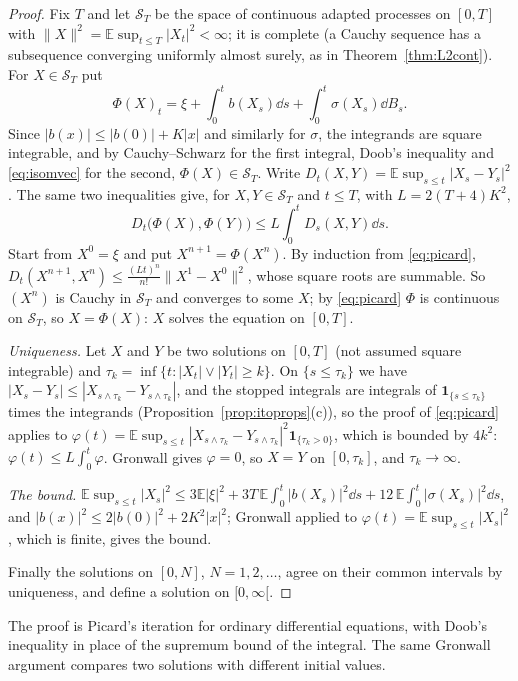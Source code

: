 \begin{proof}
Fix $T$ and let $\mathcal S_T$ be the space of continuous adapted processes on $[0,T]$ with $\|X\|^2=\mathbb E\sup_{t\le T}|X_t|^2<\infty$; it is complete (a Cauchy sequence has a subsequence converging
uniformly almost surely, as in Theorem~\ref{thm:L2cont}). For $X\in\mathcal S_T$ put
\[
\Phi(X)_t=\xi+\int_0^tb(X_s)\dd s+\int_0^t\sigma(X_s)\dd B_s.
\]
Since $|b(x)|\le|b(0)|+K|x|$ and similarly for $\sigma$, the integrands are square integrable, and by Cauchy--Schwarz for the first integral, Doob's inequality and \eqref{eq:isomvec} for the second,
$\Phi(X)\in\mathcal S_T$. Write $D_t(X,Y)=\mathbb E\sup_{s\le t}|X_s-Y_s|^2$. The same two inequalities give, for $X,Y\in\mathcal S_T$ and $t\le T$, with $L=2(T+4)K^2$,
\begin{equation}\label{eq:picard}
D_t\bigl(\Phi(X),\Phi(Y)\bigr)\le L\int_0^tD_s(X,Y)\dd s.
\end{equation} Start from $X^0=\xi$ and put $X^{n+1}=\Phi(X^n)$. By induction from \eqref{eq:picard}, $D_t(X^{n+1},X^n)\le\frac{(Lt)^n}{n!}\|X^1-X^0\|^2$, whose square roots are
summable. So $(X^n)$ is Cauchy in $\mathcal S_T$ and converges to some $X$; by \eqref{eq:picard} $\Phi$ is continuous on $\mathcal S_T$, so $X=\Phi(X)$: $X$ solves the equation on $[0,T]$.

\emph{Uniqueness.} Let $X$ and $Y$ be two solutions on $[0,T]$ (not assumed square integrable) and $\tau_k=\inf\{t:|X_t|\vee|Y_t|\ge k\}$. On $\{s\le\tau_k\}$ we have $|X_s-Y_s|\le|X_{s\wedge\tau_k}-Y_{s\wedge\tau_k}|$, and
the stopped integrals are integrals of $\mathbf 1_{\{s\le\tau_k\}}$ times the integrands (Proposition~\ref{prop:itoprops}(c)), so the proof of \eqref{eq:picard} applies to
$\varphi(t)=\mathbb E\sup_{s\le t}|X_{s\wedge\tau_k}-Y_{s\wedge\tau_k}|^2\mathbf 1_{\{\tau_k>0\}}$, which is bounded by $4k^2$:
$\varphi(t)\le L\int_0^t\varphi$. Gronwall gives $\varphi=0$, so $X=Y$ on $[0,\tau_k]$, and $\tau_k\to\infty$.

\emph{The bound.} $\mathbb E\sup_{s\le t}|X_s|^2\le3\mathbb E|\xi|^2+3T\,\mathbb E\int_0^t|b(X_s)|^2\dd s+12\,\mathbb E\int_0^t|\sigma(X_s)|^2\dd s$, and $|b(x)|^2\le2|b(0)|^2+2K^2|x|^2$; Gronwall applied to
$\varphi(t)=\mathbb E\sup_{s\le t}|X_s|^2$, which is finite, gives the bound.

Finally the solutions on $[0,N]$, $N=1,2,\dots$, agree on their common intervals by uniqueness, and define a solution on $[0,\infty[$.
\end{proof}

The proof is Picard's iteration for ordinary differential equations, with Doob's inequality in place of the supremum bound of the integral. The same Gronwall argument compares two solutions with
different initial values.

